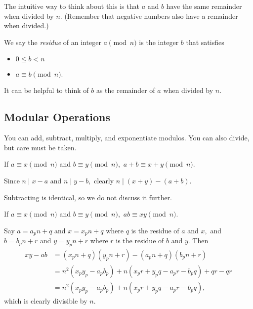 \documentclass[mast]{lucky}
\begin{document}
The intuitive way to think about this is that $a$ and $b$ have the same remainder when divided by $n.$ (Remember that negative numbers also have a remainder when divided.)

\begin{defi}
We say the \textit{residue} of an integer $a\pmod{n}$ is the integer $b$ that satisfies
\begin{itemize}
    \item $0\leq b<n$

    \item $a\equiv b\pmod{n}.$
\end{itemize}
\end{defi}

It can be helpful to think of $b$ as the remainder of $a$ when divided by $n.$

\subsection{Modular Operations}
You can add, subtract, multiply, and exponentiate modulos. You can also divide, but care must be taken.

\begin{fact}[Adding]
If $a \equiv x\pmod{n}$ and $b\equiv y\pmod{n},$ $a+b\equiv x+y\pmod{n}.$
\end{fact}

\begin{pro}
Since $n\mid x-a$ and $n\mid y-b,$ clearly $n\mid(x+y)-(a+b).$
\end{pro}

Subtracting is identical, so we do not discuss it further.

\begin{fact}[Multiplying]
If $a \equiv x\pmod{n}$ and $b\equiv y\pmod{n},$ $ab\equiv xy\pmod{n}.$
\end{fact}

\begin{pro}
Say $a=a_pn+q$ and $x=x_pn+q$ where $q$ is the residue of $a$ and $x,$ and $b=b_pn+r$ and $y=y_pn+r$ where $r$ is the residue of $b$ and $y.$ Then
\begin{align*}
xy-ab&=(x_pn+q)(y_pn+r)-(a_pn+q)(b_pn+r)\\
&=n^2(x_py_p-a_pb_p)+n(x_pr+y_pq-a_pr-b_pq)+qr-qr\\
&=n^2(x_py_p-a_pb_p)+n(x_pr+y_pq-a_pr-b_pq),
\end{align*}
which is clearly divisible by $n.$
\end{pro}
\end{document}
